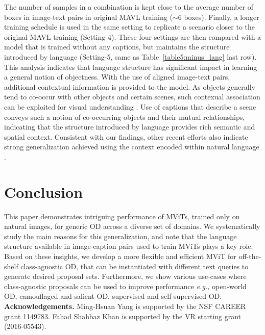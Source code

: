 \documentclass[runningheads]{llncs}
\def\eg{\emph{e.g.,}\xspace} \def\Eg{\emph{E.g.}\xspace}
\begin{document}
The number of samples in a combination is kept close to the average number of boxes in image-text pairs
in original MAVL training ($\sim$6 boxes). Finally, a longer training schedule is used in the same setting to replicate a scenario closer to the original MAVL training (Setting-4). These four settings are then compared with a model that is trained without any captions, but maintains the structure introduced by language (Setting-5, same as Table~\ref{table5:minus_lang} last row). This analysis indicates that language structure has significant impact in learning a general notion of objectness. With the use of aligned image-text pairs, additional contextual information is provided to the model. As objects generally tend to co-occur with other objects and certain scenes, such contexual association can be exploited for visual understanding \cite{OLIVA2007520}. Use of captions that describe a scene conveys such a notion of co-occurring objects and their mutual relationships, indicating that the structure introduced by language provides rich semantic and spatial context. Consistent with our findings, other recent efforts also indicate strong generalization achieved using the context encoded within natural language \cite{zhang2020putting,radford2021learning,zareian2021open,zhou2021uc2}.

\section{Conclusion}
This paper demonstrates intriguing performance of MViTs, trained only on natural images, for generic OD across a diverse set of domains. We systematically study the main reasons for this generalization, and note that the language structure available in  image-caption pairs used to train MViTs plays a key role. Based on these insights, we develop a more flexible and efficient MViT for off-the-shelf class-agnostic OD, that can be instantiated with different text queries to generate desired proposal sets. Furthermore, we show various use-cases where class-agnostic proposals can be used to improve performance \eg open-world OD, camouflaged and salient OD, supervised and self-supervised OD.\\

\noindent \textbf{Acknowledgements.} Ming-Hsuan Yang is supported by the NSF CAREER grant 1149783. Fahad Shahbaz Khan is supported by the VR starting grant (2016-05543).

\clearpage


\clearpage
\end{document}
